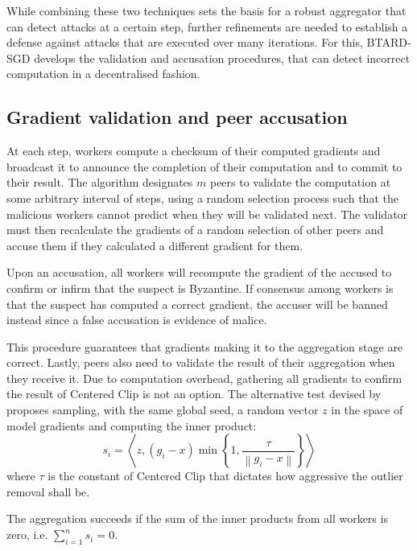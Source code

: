 \documentclass{article}
\begin{document}
While combining these two techniques sets the basis for a robust aggregator that can detect attacks at a certain step, further refinements are needed to establish a defense against attacks that are executed over many iterations. For this, BTARD-SGD develops the validation and accusation procedures, that can detect incorrect computation in a decentralised fashion. 

\subsection{Gradient validation and peer accusation}
At each step, workers compute a checksum of their computed gradients and broadcast it to announce the completion of their computation and to commit to their result. The algorithm designates $m$ peers to validate the computation at some arbitrary interval of steps, using a random selection process such that the malicious workers cannot predict when they will be validated next. The validator must then recalculate the gradients of a random selection of other peers and accuse them if they calculated a different gradient for them. 

Upon an accusation, all workers will recompute the gradient of the accused to confirm or infirm that the suspect is Byzantine. If consensus among workers is that the suspect has computed a correct gradient, the accuser will be banned instead since a false accusation is evidence of malice.


This procedure guarantees that gradients making it to the aggregation stage are correct. Lastly, peers also need to validate the result of their aggregation when they receive it. Due to computation overhead, gathering all gradients to confirm the result of Centered Clip is not an option. The alternative test devised by \cite{gorbunov2021secure} proposes sampling, with the same global seed, a random vector $z$ in the space of model gradients and computing the inner product:
\begin{equation}
s_{i}=\left\langle z,\left(g_{i}-x\right) \min \left\{1, \frac{\tau}{\left\|g_{i}-x\right\|}\right\}\right\rangle
\end{equation}
where $\tau$ is the constant of Centered Clip that dictates how aggressive the outlier removal shall be.

The aggregation succeeds if the sum of the inner products from all workers is zero, i.e. $\sum_{i = 1}^{n} s_i = 0$.
\end{document}
